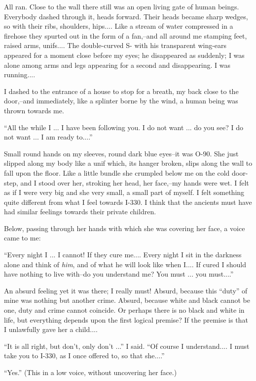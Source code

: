 \documentclass[11pt,openany]{book}
\begin{document}
All ran. Close to the wall there still was an open living gate of human beings. Everybody dashed through it, heads forward. Their heads became sharp wedges, so with their ribs, shoulders, hips.... Like a stream of water compressed in a firehose they spurted out in the form of a fan,--and all around me stamping feet, raised arms, unifs.... The double-curved S- with his transparent wing-ears appeared for a moment close before my eyes; he disappeared as suddenly; I was alone among arms and legs appearing for a second and disappearing. I was running....

I dashed to the entrance of a house to stop for a breath, my back close to the door,--and immediately, like a splinter borne by the wind, a human being was thrown towards me.

``All the while I ... I have been following you. I do not want ... do you see? I do not want ... I am ready to....''

Small round hands on my sleeves, round dark blue eyes--it was O-90. She just slipped along my body like a unif which, its hanger broken, slips along the wall to fall upon the floor. Like a little bundle she crumpled below me on the cold door-step, and I stood over her, stroking her head, her face,--my hands were wet. I felt as if I were very big and she very small, a small part of myself. I felt something quite different from what I feel towards I-330. I think that the ancients must have had similar feelings towards their private children.

Below, passing through her hands with which she was covering her face, a voice came to me:

``Every night I ... I cannot! If they cure me.... Every night I sit in the darkness alone and think of \emph{him}, and of what he will look like when I.... If cured I should have nothing to live with--do you understand me? You must ... you must....''

An absurd feeling yet it was there; I really must! Absurd, because this ``duty'' of mine was nothing but another crime. Absurd, because white and black cannot be one, duty and crime cannot coincide. Or perhaps there is no black and white in life, but everything depends upon the first logical premise? If the premise is that I unlawfully gave her a child....

``It is all right, but don't, only don't ...'' I said. ``Of course I understand.... I must take you to I-330, as I once offered to, so that she....''

``Yes.'' (This in a low voice, without uncovering her face.)
\end{document}
